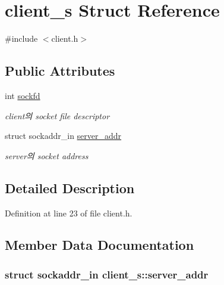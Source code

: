 \hypertarget{structclient__s}{\section{client\-\_\-s Struct Reference}
\label{structclient__s}
}


{\ttfamily \#include $<$client.\-h$>$}

\subsection*{Public Attributes}
\begin{DoxyCompactItemize}
\item 
int \hyperlink{structclient__s_a409a70b3071eaf5be18d0439d256756a}{sockfd}
\begin{DoxyCompactList}\small\item\em client의 socket file descriptor \end{DoxyCompactList}\item 
struct sockaddr\-\_\-in \hyperlink{structclient__s_a4cb8f28435762b205424d16ea39dcab3}{server\-\_\-addr}
\begin{DoxyCompactList}\small\item\em server의 socket address \end{DoxyCompactList}\end{DoxyCompactItemize}


\subsection{Detailed Description}


Definition at line 23 of file client.\-h.



\subsection{Member Data Documentation}
\hypertarget{structclient__s_a4cb8f28435762b205424d16ea39dcab3}{
\subsubsection[{server\-\_\-addr}]{\setlength{\rightskip}{0pt plus 5cm}struct sockaddr\-\_\-in client\-\_\-s\-::server\-\_\-addr}}\label{structclient__s_a4cb8f28435762b205424d16ea39dcab3}


